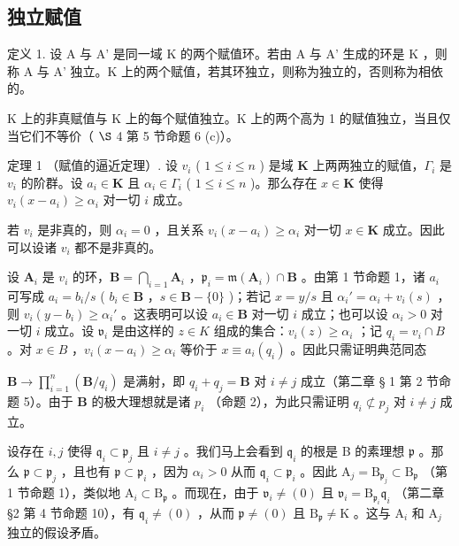 \subsection{独立赋值}

定义 1. 设 A 与 A' 是同一域 K 的两个赋值环。若由 A 与 A' 生成的环是 K ，则称 A 与 A' 独立。K 上的两个赋值，若其环独立，则称为独立的，否则称为相依的。

K 上的非真赋值与 K 上的每个赋值独立。K 上的两个高为 1 的赋值独立，当且仅当它们不等价（ \(\S\) 4 第 5 节命题 6 (c)）。

定理 1 （赋值的逼近定理）. 设 \(v_{i}\) ( \(1 \leqslant i \leqslant n\) ) 是域 \(\mathbf{K}\) 上两两独立的赋值，\(\Gamma_{i}\) 是 \(v_{i}\) 的阶群。设 \(a_{i} \in \mathbf{K}\) 且 \(\alpha_{i} \in \Gamma_{i}\) ( \(1 \leqslant i \leqslant n\) )。那么存在 \(x \in \mathbf{K}\) 使得 \(v_{i}(x - a_{i}) \geqslant \alpha_{i}\) 对一切 \(i\) 成立。

若 \(v_{i}\) 是非真的，则 \(\alpha_{i} = 0\) ，且关系 \(v_{i}(x - a_{i}) \geqslant \alpha_{i}\) 对一切 \(x \in \mathbf{K}\) 成立。因此可以设诸 \(v_{i}\) 都不是非真的。

设 \(\mathbf{A}_i\) 是 \(v_i\) 的环，\(\mathbf{B} = \bigcap_{i=1} \mathbf{A}_i\) ，\(\mathfrak{p}_i = \mathfrak{m}(\mathbf{A}_i) \cap \mathbf{B}\) 。由第 1 节命题 1，诸 \(a_i\) 可写成 \(a_i = b_i / s\) ( \(b_i \in \mathbf{B}\) ，\(s \in \mathbf{B} - \{0\}\) )；若记 \(x = y / s\) 且 \(\alpha_i' = \alpha_i + v_i(s)\) ，则 \(v_i(y - b_i) \geqslant \alpha_i'\) 。这表明可以设 \(a_i \in \mathbf{B}\) 对一切 \(i\) 成立；也可以设 \(\alpha_i > 0\) 对一切 \(i\) 成立。设 \(\mathfrak{v}_i\) 是由这样的 \(z \in K\) 组成的集合：\(v_{i}(z) \geqslant \alpha_{i}\) ；记 \(q_{i} = v_{i} \cap B\) 。对 \(x \in B\) ，\(v_{i}(x - a_{i}) \geqslant \alpha_{i}\) 等价于 \(x \equiv a_{i}(q_{i})\) 。因此只需证明典范同态

\(\mathbf{B} \to \prod_{i=1}^{n} \left( \mathbf{B} / q_i \right)\) 是满射，即 \(q_i + q_j = \mathbf{B}\) 对 \(i \neq j\) 成立（第二章 § 1 第 2 节命题 5）。由于 \(\mathbf{B}\) 的极大理想就是诸 \(p_i\) （命题 2），为此只需证明 \(q_i \not\subset p_j\) 对 \(i \neq j\) 成立。

设存在 \(i, j\) 使得 \(\mathfrak{q}_i \subset \mathfrak{p}_j\) 且 \(i \neq j\) 。我们马上会看到 \(\mathfrak{q}_i\) 的根是 B 的素理想 \(\mathfrak{p}\) 。那么 \(\mathfrak{p} \subset \mathfrak{p}_j\) ，且也有 \(\mathfrak{p} \subset \mathfrak{p}_i\) ，因为 \(\alpha_i > 0\) 从而 \(\mathfrak{q}_i \subset \mathfrak{p}_i\) 。因此 \(\mathrm{A}_j = \mathrm{B}_{\mathfrak{p}_j} \subset \mathrm{B}_{\mathfrak{p}}\) （第 1 节命题 1），类似地 \(\mathrm{A}_i \subset \mathrm{B}_{\mathfrak{p}}\) 。而现在，由于 \(\mathfrak{v}_i \neq (0)\) 且 \(\mathfrak{v}_i = \mathrm{B}_{\mathfrak{p}_i} \mathfrak{q}_i\) （第二章 §2 第 4 节命题 10），有 \(\mathfrak{q}_i \neq (0)\) ，从而 \(\mathfrak{p} \neq (0)\) 且 \(\mathrm{B}_{\mathfrak{p}} \neq \mathrm{K}\) 。这与 \(\mathrm{A}_i\) 和 \(\mathrm{A}_j\) 独立的假设矛盾。

